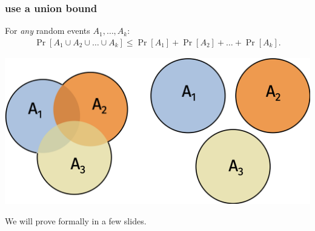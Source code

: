 \documentclass[compress]{beamer}
\newcommand{\E}{\mathbb{E}}
\begin{document}
\begin{frame}
	\frametitle{use a union bound}
	\begin{lemma}
		For \emph{any} random events $A_1, \ldots, A_k$:
		\begin{align*}
			\Pr[A_1 \cup A_2 \cup \ldots \cup A_k] \leq \Pr[A_1] + \Pr[A_2] + \ldots +\Pr[A_k].
		\end{align*}
	\end{lemma}
	\begin{center}
		\includegraphics[width=.8\textwidth]{union_bound_proof.png}
	\end{center}
We will prove formally in a few slides.
\end{frame}

\end{document}
